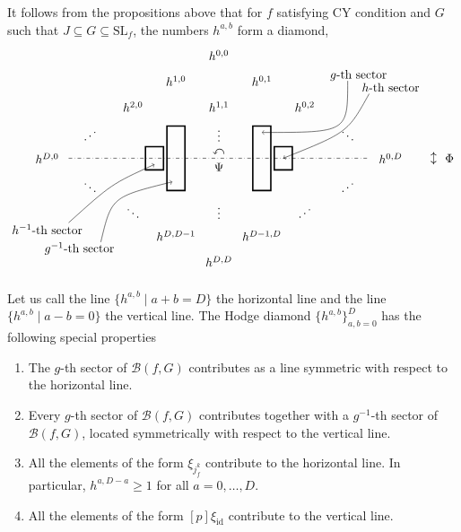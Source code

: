 \documentclass[10pt,a4paper]{article}
\numberwithin{equation}{section}
\def\rdots{\reflectbox{$\ddots$}}
\newcommand{\SL}{{\mathrm{SL}}}
\newcommand{\id}{\mathrm{id}}
\def\B{{\mathcal B}}
\begin{document}
It follows from the propositions above that for $f$ satisfying CY condition and $G$ such that $J \subseteq G \subseteq \SL_f$, the numbers $h^{a,b}$ form a diamond,
\[
\begin{tikzpicture}
\begin{scope}[x={(-1.25cm,-.75cm)},y={(1.25cm,-.75cm)}]
\node at (0,0) {$h^{0,0}$};
\node at (0,1) {$h^{0,1}$};
\node at (1,0) {$h^{1,0}$};
\node at (1,1) {$h^{1,1}$};
\node at (2,0) {$h^{2,0}$};
\node at (0,2) {$h^{0,2}$};
\node at (3,0) {$\rdots$};
\node at (0,3) {$\ddots$};
\node at (1.5,1.5) {$\vdots$};
\node at (4,0) {$h^{D,0}$};
\node at (0,4) {$h^{0,D}$};
\node at (4,1) {$\ddots$};
\node at (1,4) {$\rdots$};
\node at (3,3) {$\vdots$};
\node at (4,2) {$\ddots$};
\node at (2,4) {$\rdots$};
\node at (4,3) {$h^{D,D-1}$};
\node at (3,4) {$h^{D-1,D}$};
\node at (4,4) {$h^{D,D}$};
\node [label=below:$\Psi$] at (2-.125, 2-.125) {$\curvearrowleft$};
\node [label=right:$\Phi$] at (-.5, 4 + .5) {$\updownarrow$};
\draw[very thick] (1-.105-.125,2+.105-.125) rectangle (2+.105+.125,3-.105+.125);
\draw[very thick] (2-.105-.125,1+.105-.125) rectangle (3+.105+.125,2-.105+.125);
\draw[very thick] (1+0.25-.105-.225,3-0.25+.105-.225) rectangle (1+0.25+.105+.225,3-0.25-.105+.225);
\draw[very thick] (3-.5+0.25-.105-.225,1+.5-0.25+.105-.225) rectangle (3-.5+0.25+.105+.225,1+.5-0.25-.105+.225);
\draw[dash dot] (4-.25,.25) -- (.25,4-.25);
\draw[->] (-1,2) .. controls (0,3) .. (1,2);
\node at (-1-.125-.105,2+.125-.105) {$g$-th sector};
\node at (-1-.5+.125,2+.5+.125) {$h$-th sector};
\draw[->] (-1,2+.5) .. controls (0,3) .. (1+0.25,3-0.25);
\node at (4+1+.125+.25,4-2-.125+.25) {$g^{-1}$-th sector};
\node at (4+1+.5-.125,4-2-.5-.125) {$h^{-1}$-th sector};
\draw[->] (4+1-.25+.25,4-2-.5) .. controls (4-.25,1+.25) .. (3-.5+0.25+.105+.225-.105-.105,1+.5-0.25-.105+.225);
\draw[->] (4+1,4-2+.25) .. controls (4,1+.5) .. (3,2-.105+.125-.105);
\end{scope}
\end{tikzpicture}
\]

Let us call the line $\bigl\lbrace h^{a,b} \mid a+b = D \bigr\rbrace$ the horizontal line and the line $\bigl\lbrace h^{a,b} \mid a-b = 0 \bigr\rbrace$ the vertical line.
The Hodge diamond $\bigl\lbrace h^{a,b} \bigr\rbrace_{a,b=0}^D$ has the following special properties
\begin{enumerate}\itemsep=0pt
 \item[(1)] The $g$-th sector of $\B(f,G)$ contributes as a line symmetric with respect to the horizontal line.
 \item[(2)] Every $g$-th sector of $\B(f,G)$ contributes together with a $g^{-1}$-th sector of $\B(f,G)$, located symmetrically with respect to the vertical line.
 \item[(3)] All the elements of the form $\xi_{j_f^k}$ contribute to the horizontal line. In particular, $h^{a,D-a} \ge 1$ for all $a=0,\dots,D$.
 \item[(4)] All the elements of the form $[p]\xi_\id$ contribute to the vertical line.
\end{enumerate}
\end{document}

